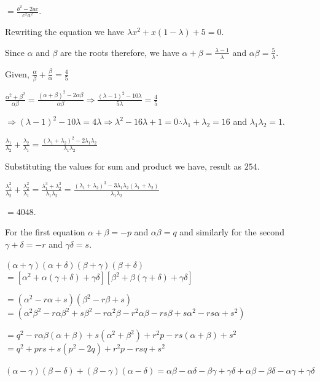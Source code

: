   $= \frac{b^2 - 2ac}{c^2a^2}$.
\item Rewriting the equation we have $\lambda x^2 + x(1 - \lambda) + 5 = 0$.

  Since $\alpha$ and $\beta$ are the roots therefore, we have $\alpha + \beta = \frac{\lambda - 1}{\lambda}$
  and $\alpha\beta = \frac{5}{\lambda}$.

  Given, $\frac{\alpha}{\beta} + \frac{\beta}{\alpha} = \frac{4}{5}$

  $\frac{\alpha^2 + \beta^2}{\alpha\beta} = \frac{(\alpha + \beta)^2 - 2\alpha\beta}{\alpha\beta}\Rightarrow
  \frac{(\lambda - 1)^2 - 10\lambda}{5\lambda} = \frac{4}{5}$

  $\Rightarrow (\lambda - 1)^2 - 10\lambda = 4\lambda \Rightarrow \lambda^2 - 16\lambda + 1 = 0\therefore
  \lambda_1 + \lambda_2 = 16$ and $\lambda_1\lambda_2 = 1$.
  \startitemize[i]
  \item $\frac{\lambda_1}{\lambda_2} + \frac{\lambda_2}{\lambda_1} = \frac{(\lambda_1 + \lambda_2)^2 -
    2\lambda_1\lambda_2}{\lambda_1\lambda_2}$

    Substituting the values for sum and product we have, result as $254$.
  \item $\frac{\lambda_1^2}{\lambda_2} + \frac{\lambda_2^2}{\lambda_1} = \frac{\lambda_1^3 +
    \lambda_2^3}{\lambda_1\lambda_2} = \frac{(\lambda_1 + \lambda_2)^3 - 3\lambda_1\lambda_2(\lambda_1 +
    \lambda_2)}{\lambda_1\lambda_2}$

    $= 4048$.
  \stopitemize
\item For the first equation $\alpha + \beta = -p$ and $\alpha\beta = q$ and similarly for the second
  $\gamma + \delta = -r$ and $\gamma\delta = s$.
  \startitemize[i]
  \item $(\alpha + \gamma)(\alpha + \delta)(\beta + \gamma)(\beta + \delta)$
    $= [\alpha^2 + \alpha(\gamma + \delta) + \gamma\delta][\beta^2 + \beta(\gamma + \delta) + \gamma\delta]$

    $= (\alpha^2 - r\alpha + s)(\beta^2 - r\beta + s)$
    $= (\alpha^2\beta^2 - r\alpha\beta^2 + s\beta^2 - r\alpha^2\beta - r^2\alpha\beta - rs\beta + s\alpha^2 - rs\alpha +
    s^2)$

    $= q^2 - r\alpha\beta(\alpha + \beta) + s(\alpha^2 + \beta^2) + r^2p - rs(\alpha + \beta) + s^2$
    $= q^2 + prs + s(p^2 - 2q) + r^2p - rsq + s^2$

  \item $(\alpha - \gamma)(\beta - \delta) + (\beta - \gamma)(\alpha - \delta) = \alpha\beta -
    \alpha\delta - \beta\gamma + \gamma\delta + \alpha\beta - \beta\delta -\alpha\gamma + \gamma\delta$


